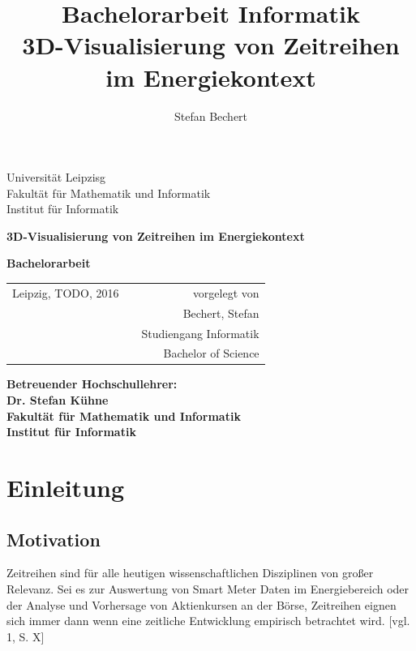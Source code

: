 \documentclass[12pt]{article}
\title{Bachelorarbeit Informatik\\ 3D-Visualisierung von Zeitreihen im
Energiekontext}
\author{Stefan Bechert}
\begin{document}
\thispagestyle{empty}
\begin{center}
	\begin{bfseries}
		Universität Leipzisg\\
		Fakultät für Mathematik und Informatik\\
		Institut für Informatik
	\end{bfseries}
\end{center}
\vspace{4cm}
\begin{center}
 	\large{\textbf{3D-Visualisierung von Zeitreihen im Energiekontext}}
\end{center}
\vspace{3cm}
\begin{center}
	\LARGE{\textbf{Bachelorarbeit}}
\end{center}
\vspace{5cm}
\begin{tabular}{lp{18em}r}
	Leipzig, TODO, 2016 && vorgelegt von \\[0.4cm]
	&& Bechert, Stefan\\
	&& Studiengang Informatik \\
	&& Bachelor of Science
\end{tabular}

\vspace{2cm}
\begin{flushleft}
	\textbf{Betreuender Hochschullehrer: \\Dr. Stefan Kühne\\Fakultät für
	Mathematik und Informatik\\Institut für Informatik}
\end{flushleft}

\newpage
\thispagestyle{empty}
\tableofcontents \newpage

\section{Einleitung}
\thispagestyle{empty}
	\subsection{Motivation}
Zeitreihen sind für alle heutigen wissenschaftlichen Disziplinen von großer
Relevanz. Sei es zur Auswertung von Smart Meter Daten im Energiebereich oder der
Analyse und Vorhersage von Aktienkursen an der Börse, Zeitreihen eignen sich
immer dann wenn eine zeitliche Entwicklung empirisch betrachtet wird.
[vgl. 1, S. X]\\[0.4cm]
		
\end{document}
